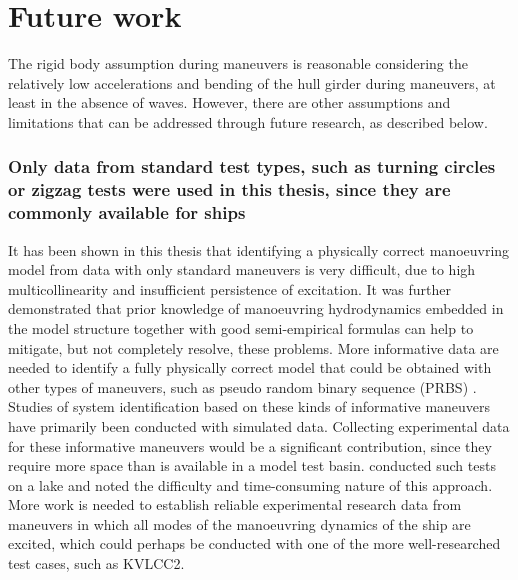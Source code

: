 \chapter{Future work\label{ch:future_work}}

\noindent The rigid body assumption during maneuvers is reasonable considering the relatively low accelerations and bending of the hull girder during maneuvers, at least in the absence of waves. However, there are other assumptions and limitations that can be addressed through future research, as described below.

\subsection*{Only data from standard test types, such as turning circles or zigzag tests were used in this thesis, since they are commonly available for ships}
It has been shown in this thesis that identifying a physically correct manoeuvring model from data with only standard maneuvers is very difficult, due to high multicollinearity and insufficient persistence of excitation. 
It was further demonstrated that prior knowledge of manoeuvring hydrodynamics embedded in the model structure together with good semi-empirical formulas can help to mitigate, but not completely resolve, these problems. More informative data are needed to identify a fully physically correct model that could be obtained with other types of maneuvers, such as pseudo random binary sequence (PRBS) \cite{yoonIdentificationHydrodynamicCoefficients2003,wangOptimalDesignExcitation2020}. Studies of system identification based on these kinds of informative maneuvers have primarily been conducted with simulated data. Collecting experimental data for these informative maneuvers would be a significant contribution,  since they require more space than is available in a model test basin. \textcite{millerShipModelIdentification2021} conducted such tests on a lake and noted the difficulty and time-consuming nature of this approach.
More work is needed to establish reliable experimental research data from maneuvers in which all modes of the manoeuvring dynamics of the ship are excited, which could perhaps be conducted with one of the more well-researched test cases, such as KVLCC2. 

